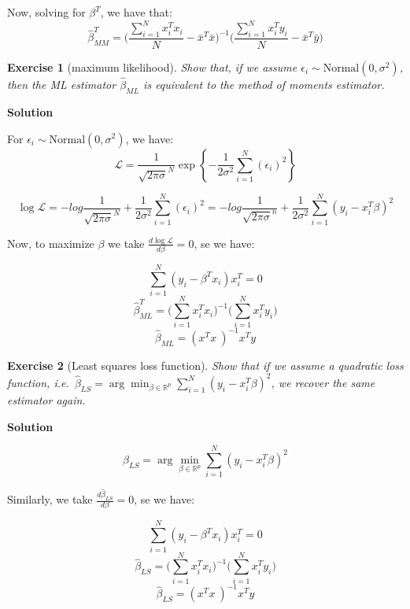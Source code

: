 \documentclass[twoside]{article}
\newcounter{lecnum}
\newtheorem{exercise}{Exercise}[lecnum]
\begin{document}
Now, solving for $\beta^T$, we have that:
$$ \hat{\beta}_{MM}^T= \bigg(\frac{\sum_{i=1}^{N} x_i^Tx_i}{N}-\bar{x}^T\bar{x}\bigg)^{-1}\bigg(\frac{\sum_{i=1}^{N} x_i^Ty_i}{N}-\bar{x}^T\bar{y}\bigg)$$

\color{black}

\begin{exercise}[maximum likelihood]
  Show that, if we assume $\epsilon_i\sim \mbox{Normal}(0,\sigma^2)$, then the ML estimator $\hat{\beta}_{ML}$ is equivalent to the method of moments estimator.
\end{exercise}

\color{blue}
\textbf{Solution}

For $\epsilon_i\sim \mbox{Normal}(0,\sigma^2)$, we have:
$$ \mathcal{L} = \frac{1}{ \sqrt {2 \pi \sigma}^N} \exp\left\{ -\frac{1}{2 \sigma^2} \sum_{i=1}^{N} (\epsilon_i)^2 \right\}   $$

$$ \log{\mathcal{L}} = -log {\frac{1}{ \sqrt {2 \pi \sigma}^N}} +\frac{1}{2 \sigma^2} \sum_{i=1}^{N} (\epsilon_i)^2 = - log {\frac{1}{ \sqrt {2 \pi \sigma}^n}} +\frac{1}{2 \sigma^2} \sum_{i=1}^{N} (y_i-x_i^T\beta)^2 $$

Now, to maximize $\beta$ we take $ \frac{d \log{\mathcal{L}}}{d\beta} = 0  $, se we have:

$$ \sum_{i=1}^{N} (y_i-\beta^Tx_i)x_i^T = 0$$
$$ \hat{\beta}_{ML}^T = \bigg(\sum_{i=1}^{N} x_i^Tx_i\bigg)^{-1}  \bigg(\sum_{i=1}^{N} x_i^T y_i \bigg) $$
$$ \hat{\beta}_{ML} =(  x^Tx\ )^{-1}    x^Ty   $$

\color{black}


\begin{exercise}[Least squares loss function]
  Show that if we assume a quadratic loss function, i.e.\ $\hat{\beta}_{LS} = \arg\min_{\beta\in \mathbb{R}^p}\sum_{i=1}^N(y_i - x_i^T\beta)^2$, we recover the same estimator again.
\end{exercise}

\color{blue}
\textbf{Solution}

$$ \hat{\beta}_{LS} = \arg\min_{\beta\in \mathbb{R}^p}\sum_{i=1}^N(y_i - x_i^T\beta)^2 $$

Similarly, we take $ \frac{d {\hat{\beta}_{LS} }}{d\beta} = 0  $, se we have:

$$ \sum_{i=1}^{N} (y_i-\beta^Tx_i)x_i^T = 0$$
$$ \hat{\beta}_{LS} =\bigg(\sum_{i=1}^{N} x_i^Tx_i\bigg)^{-1}  \bigg(\sum_{i=1}^{N} x_i^Ty_i \bigg) $$
$$ \hat{\beta}_{LS} =(  x^Tx\ )^{-1}    x^Ty   $$


\color{black}
\end{document}
